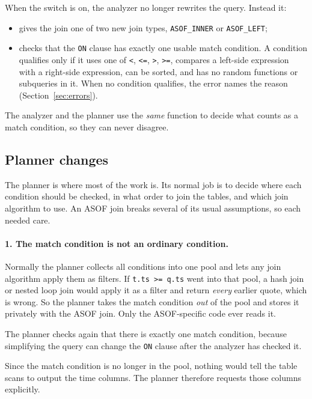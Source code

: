 \documentclass[11pt,a4paper]{article}
\newcommand{\code}[1]{\texttt{#1}}
\begin{document}
When the switch is on, the analyzer no longer rewrites the query. Instead it:

\begin{itemize}
  \item gives the join one of two new join types, \code{ASOF\_INNER} or
        \code{ASOF\_LEFT};
  \item checks that the \code{ON} clause has exactly one usable match condition. A
        condition qualifies only if it uses one of \code{<}, \code{<=}, \code{>},
        \code{>=}, compares a left-side expression with a right-side expression, can be
        sorted, and has no random functions or subqueries in it. When no condition
        qualifies, the error names the reason (Section~\ref{sec:errors}).
\end{itemize}

The analyzer and the planner use the \emph{same} function to decide what counts as a match
condition, so they can never disagree.

\subsection{Planner changes}

The planner is where most of the work is. Its normal job is to decide where each
condition should be checked, in what order to join the tables, and which join algorithm
to use. An ASOF join breaks several of its usual assumptions, so each needed care.

\paragraph{1. The match condition is not an ordinary condition.}
Normally the planner collects all conditions into one pool and lets any join algorithm
apply them as filters. If \code{t.ts >= q.ts} went into that pool, a hash join or nested
loop join would apply it as a filter and return \emph{every} earlier quote, which is
wrong. So the planner takes the match condition \emph{out} of the pool and stores it
privately with the ASOF join. Only the ASOF-specific code ever reads it.

The planner checks again that there is exactly one match condition, because simplifying
the query can change the \code{ON} clause after the analyzer has checked it.

Since the match condition is no longer in the pool, nothing would tell the table scans to
output the time columns. The planner therefore requests those columns explicitly.
\end{document}
